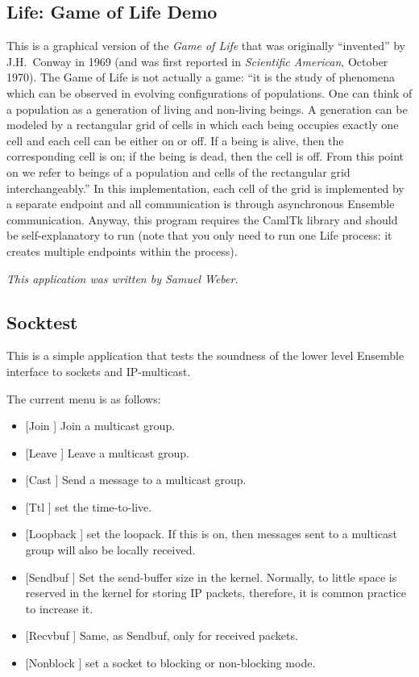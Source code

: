 \subsection{Life: Game of Life Demo}
This is a graphical version of the \emph{Game of Life} that was
originally ``invented'' by J.H.~Conway in 1969 (and was first
reported in \emph{Scientific American}, October 1970).  The Game of
Life is not actually a game: ``it is the study of phenomena which can
be observed in evolving configurations of populations.  One can think
of a population as a generation of living and non-living beings.  A
generation can be modeled by a rectangular grid of cells in which
each being occupies exactly one cell and each cell can be either on
or off.  If a being is alive, then the corresponding cell is on; if
the being is dead, then the cell is off.  From this point on we refer
to beings of a population and cells of the rectangular grid
interchangeably.''  In this implementation, each cell of the grid is
implemented by a separate endpoint and all communication is through
asynchronous Ensemble communication.  Anyway, this program requires
the CamlTk library and should be self-explanatory to run (note that
you only need to run one Life process: it creates multiple endpoints
within the process).

\emph{This application was written by Samuel Weber.}

\subsection{Socktest}
This is a simple application that tests the soundness of the
lower level Ensemble interface to sockets and IP-multicast.

The current menu is as follows:
\begin{itemize}
\item
{[Join  ]} Join a multicast group.
\item 
{[Leave  ]} Leave a multicast group.
\item 
{[Cast  ]} Send a message to a multicast
group.
\item 
{[Ttl  ]} set the time-to-live.
\item 
{[Loopback  ]} set the loopack. If this is on, then
messages sent to a multicast group will also be locally received.
\item 
{[Sendbuf  ]} Set the send-buffer size in the kernel.
Normally, to little space is reserved in the kernel for storing IP
packets, therefore, it is common practice to increase it.
\item 
{[Recvbuf ]} 
Same, as Sendbuf, only for received packets.
\item 
{[Nonblock  ]} set a socket to blocking or non-blocking
mode.
\end{itemize}



